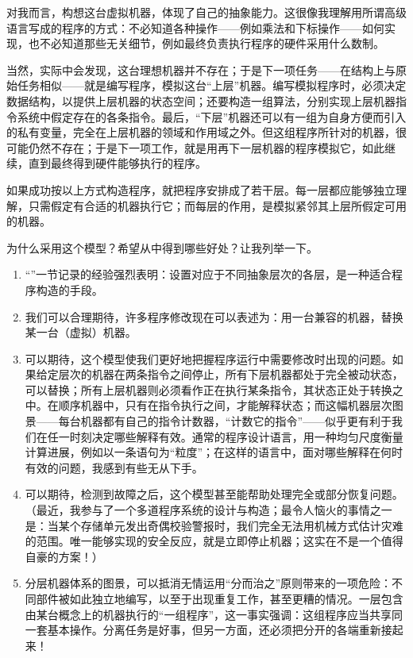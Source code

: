 \documentclass[twoside,11pt,fontset=none]{ctexbook}
\begin{document}
对我而言，构想这台虚拟机器，体现了自己的抽象能力。这很像我理解用所谓高级语言写成的程序的方式：不必知道各种操作——例如乘法和下标操作——如何实现，也不必知道那些无关细节，例如最终负责执行程序的硬件采用什么数制。

当然，实际中会发现，这台理想机器并不存在；于是下一项任务——在结构上与原始任务相似——就是编写程序，模拟这台“上层”机器。编写模拟程序时，必须决定数据结构，以提供上层机器的状态空间；还要构造一组算法，分别实现上层机器指令系统中假定存在的各条指令。最后，“下层”机器还可以有一组为自身方便而引入的私有变量，完全在上层机器的领域和作用域之外。但这组程序所针对的机器，很可能仍然不存在；于是下一项工作，就是用再下一层机器的程序模拟它，如此继续，直到最终得到硬件能够执行的程序。

如果成功按以上方式构造程序，就把程序安排成了若干层。每一层都应能够独立理解，只需假定有合适的机器执行它；而每层的作用，是模拟紧邻其上层所假定可用的机器。

为什么采用这个模型？希望从中得到哪些好处？让我列举一下。

\begin{enumerate}[wide, nosep, label=(\arabic*)]
	\item “”一节记录的经验强烈表明：设置对应于不同抽象层次的各层，是一种适合程序构造的手段。

	\item 我们可以合理期待，许多程序修改现在可以表述为：用一台兼容的机器，替换某一台（虚拟）机器。

	\item 可以期待，这个模型使我们更好地把握程序运行中需要修改时出现的问题。如果给定层次的机器在两条指令之间停止，所有下层机器都处于完全被动状态，可以替换；所有上层机器则必须看作正在执行某条指令，其状态正处于转换之中。在顺序机器中，只有在指令执行之间，才能解释状态；而这幅机器层次图景——每台机器都有自己的指令计数器，“计数它的指令”——似乎更有利于我们在任一时刻决定哪些解释有效。通常的程序设计语言，用一种均匀尺度衡量计算进展，例如以一条语句为“粒度”；在这样的语言中，面对哪些解释在何时有效的问题，我感到有些无从下手。
	
	\item 可以期待，检测到故障之后，这个模型甚至能帮助处理完全或部分恢复问题。（最近，我参与了一个多道程序系统的设计与构造；最令人恼火的事情之一是：当某个存储单元发出奇偶校验警报时，我们完全无法用机械方式估计灾难的范围。唯一能够实现的安全反应，就是立即停止机器；这实在不是一个值得自豪的方案！）
	
	\item 分层机器体系的图景，可以抵消无情运用“分而治之”原则带来的一项危险：不同部件被如此独立地编写，以至于出现重复工作，甚至更糟的情况。一层包含由某台概念上的机器执行的“一组程序”，这一事实强调：这组程序应当共享同一套基本操作。分离任务是好事，但另一方面，还必须把分开的各端重新接起来！
\end{enumerate}
\end{document}
